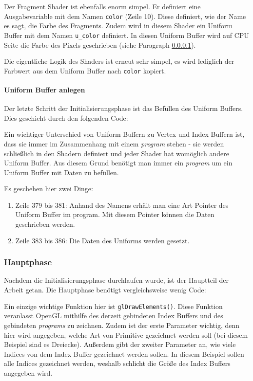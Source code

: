 Der Fragment Shader ist ebenfalls enorm simpel. Er definiert eine Ausgabevariable mit dem Namen \texttt{color} (Zeile 10). Diese definiert, wie der Name es sagt, die Farbe des Fragments. Zudem wird in diesem Shader ein Uniform Buffer mit dem Namen \texttt{u\_color} definiert. In diesen Uniform Buffer wird auf CPU Seite die Farbe des Pixels geschrieben (siehe Paragraph \ref{sec:example:theexample:initphase:uniform}).

Die eigentliche Logik des Shaders ist erneut sehr simpel, es wird lediglich der Farbwert aus dem Uniform Buffer nach \texttt{color} kopiert.

\paragraph{Uniform Buffer anlegen}
\label{sec:example:theexample:initphase:uniform}
Der letzte Schritt der Initialisierungsphase ist das Befüllen des Uniform Buffers. Dies geschieht durch den folgenden Code:

Ein wichtiger Unterschied von Uniform Buffern zu Vertex und Index Buffern ist, dass sie immer im Zusammenhang mit einem \textit{program} stehen - sie werden schließlich in den Shadern definiert und jeder Shader hat womöglich andere Uniform Buffer. Aus diesem Grund benötigt man immer ein \textit{program} um ein Uniform Buffer mit Daten zu befüllen.

Es geschehen hier zwei Dinge:
\begin{enumerate}
    \item Zeile 379 bis 381: Anhand des Namens erhält man eine Art Pointer des Uniform Buffer im program. Mit diesem Pointer können die Daten geschrieben werden.
    \item Zeile 383 bis 386: Die Daten des Uniforms werden gesetzt.
\end{enumerate}

\subsubsection{Hauptphase}
Nachdem die Initialisierungsphase durchlaufen wurde, ist der Hauptteil der Arbeit getan. Die Hauptphase benötigt vergleichsweise wenig Code:

Ein einzige wichtige Funktion hier ist \texttt{glDrawElements()}. Diese Funktion veranlasst OpenGL mithilfe des derzeit gebindeten Index Buffers und des gebindeten \textit{programs} zu zeichnen. Zudem ist der erste Parameter wichtig, denn hier wird angegeben, welche Art von Primitive gezeichnet werden soll (bei diesem Beispiel sind es Dreiecke). Außerdem gibt der zweiter Parameter an, wie viele Indices von dem Index Buffer gezeichnet werden sollen. In diesem Beispiel sollen alle Indices gezeichnet werden, weshalb schlicht die Größe des Index Buffers angegeben wird.

